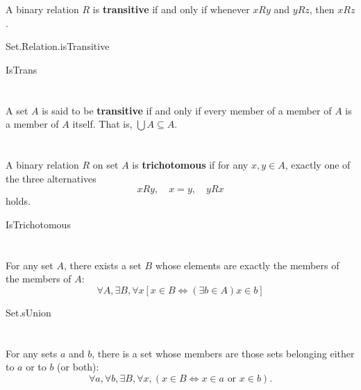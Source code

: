 \documentclass{report}
\begin{document}
\section{}%

  A binary relation $R$ is \textbf{transitive} if and only if whenever $xRy$ and
    $yRz$, then $xRz$.

    {Set.Relation.isTransitive}

    {IsTrans}

\section{}%

  A set $A$ is said to be \textbf{transitive} if and only if every member of a
    member of $A$ is a member of $A$ itself.
  That is, $\bigcup A \subseteq A$.

\section{}%

  A binary relation $R$ on set $A$ is \textbf{trichotomous} if for any
    $x, y \in A$, exactly one of the three alternatives
    $$xRy, \quad x = y, \quad yRx$$
    holds.

    {IsTrichotomous}

\section{}%

  For any set $A$, there exists a set $B$ whose elements are exactly the members
    of the members of $A$:
    $$\forall A, \exists B, \forall x
      \left[ x \in B \iff (\exists b \in A) x \in b \right]$$

    {Set.sUnion}

\section{}%

  For any sets $a$ and $b$, there is a set whose members are those sets
    belonging either to $a$ or to $b$ (or both):
    $$\forall a, \forall b, \exists B, \forall x,
        (x \in B \iff x \in a \text{ or } x \in b).$$
\end{document}
